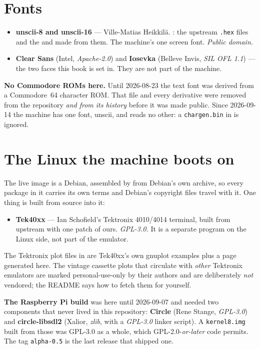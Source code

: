 \section{Fonts}
\begin{itemize}[leftmargin=1.4em]
\item \textbf{unscii-8 and unscii-16} --- Ville-Matias Heikkilä.
  : the upstream \verb|.hex| files and the
   and  made from them.
  The machine's one screen font. \emph{Public domain.}
\item \textbf{Clear Sans} (Intel, \emph{Apache-2.0}) and
  \textbf{Iosevka} (Belleve Invis, \emph{SIL OFL 1.1}) --- the two
  faces this book is set in. They are not part of the machine.
\end{itemize}

\begin{aside}
\textbf{No Commodore ROMs here.} Until 2026-08-23 the text font was
derived from a Commodore~64 character ROM. That file and every
derivative were removed from the repository \emph{and from its
history} before it was made public. Since 2026-09-14 the machine has
one font, unscii, and reads no other: a \verb|chargen.bin| in
 is ignored.
\end{aside}

\section{The Linux the machine boots on}
The live image is a Debian, assembled by  from
Debian's own archive, so every package in it carries its own terms and
Debian's copyright files travel with it. One
thing is built from source into it:
\begin{itemize}[leftmargin=1.4em]
\item \textbf{Tek40xx} --- Ian Schofield's Tektronix 4010/4014
  terminal, built from upstream with one patch of ours.
  \emph{GPL-3.0.} It is a separate program on the Linux side, not part
  of the emulator.
\end{itemize}
\noindent The Tektronix plot files in  are
Tek40xx's own gnuplot examples plus a page generated here. The vintage
cassette plots that circulate with \emph{other} Tektronix emulators are
marked personal-use-only by their authors and are deliberately \emph{not}
vendored; the README says how to fetch them for yourself.

\begin{aside}
\textbf{The Raspberry Pi build} was here until 2026-09-07 and needed two
components that never lived in this repository: \textbf{Circle} (Rene
Stange, \emph{GPL-3.0}) and \textbf{circle-libsdl2} (Xalior,
\emph{zlib}, with a \emph{GPL-3.0} linker script). A \verb|kernel8.img|
built from those was GPL-3.0 as a whole, which GPL-2.0-\emph{or-later}
code permits. The tag \texttt{alpha-0.5} is the last release that
shipped one.
\end{aside}

